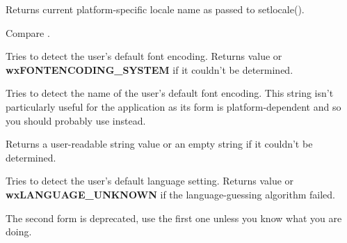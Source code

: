 \label{wxlocalegetsysname}


Returns current platform-specific locale name as passed to setlocale().

Compare .



\label{wxlocalegetsystemencoding}


Tries to detect the user's default font encoding.
Returns  value or 
{\bf wxFONTENCODING\_SYSTEM} if it couldn't be determined.


\label{wxlocalegetsystemencodingname}


Tries to detect the name of the user's default font encoding. This string isn't
particularly useful for the application as its form is platform-dependent and
so you should probably use 
 instead.

Returns a user-readable string value or an empty string if it couldn't be
determined.


\label{wxlocalegetsystemlanguage}


Tries to detect the user's default language setting.
Returns  value or 
 {\bf wxLANGUAGE\_UNKNOWN} if the language-guessing algorithm failed.



\label{wxlocaleinit}




The second form is deprecated, use the first one unless you know what you are
doing. 


